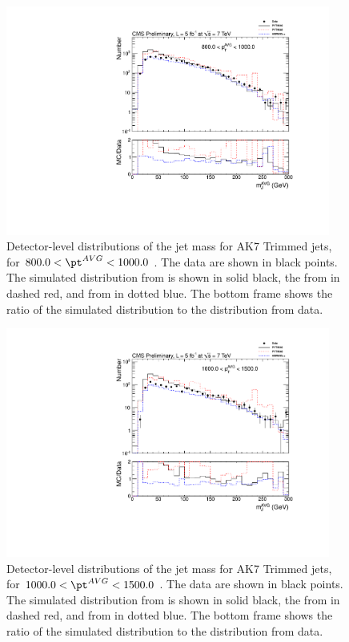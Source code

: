 \begin{figure}[htbp]
\centering
\includegraphics[width=0.95\textwidth]{figs/histAK7MjetVsPtAvg_rawDataMCComparisons_pt_9_Trimmed}
\caption{Detector-level distributions of the jet mass for AK7 Trimmed jets,
for $800.0 < \pt^{AVG} < 1000.0$ \GeVc. The data are shown in black points.
The simulated distribution from \PYTHIA is shown in solid black, 
the from \PYTHIAEIGHT in dashed red, and from \HERWIG in dotted blue. 
The bottom frame shows the ratio of the simulated distribution
to the distribution from data. 
\label{figs:histAK7MjetVsPtAvg_rawDataMCComparisons_pt_9_Trimmed}}
\end{figure}



\begin{figure}[htbp]
\centering
\includegraphics[width=0.95\textwidth]{figs/histAK7MjetVsPtAvg_rawDataMCComparisons_pt_10_Trimmed}
\caption{Detector-level distributions of the jet mass for AK7 Trimmed jets,
for $1000.0 < \pt^{AVG} < 1500.0$ \GeVc. The data are shown in black points.
The simulated distribution from \PYTHIA is shown in solid black, 
the from \PYTHIAEIGHT in dashed red, and from \HERWIG in dotted blue. 
The bottom frame shows the ratio of the simulated distribution
to the distribution from data. 
\label{figs:histAK7MjetVsPtAvg_rawDataMCComparisons_pt_10_Trimmed}}
\end{figure}


